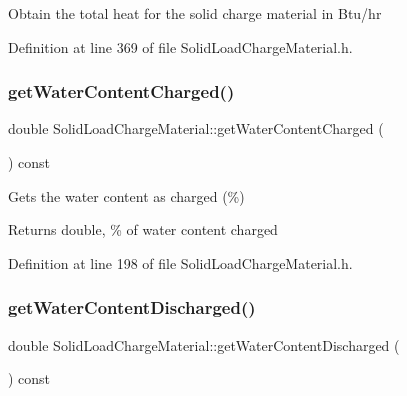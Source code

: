 Obtain the total heat for the solid charge material in Btu/hr 

Definition at line 369 of file Solid\+Load\+Charge\+Material.\+h.

\mbox{\label{class_solid_load_charge_material_a2f99a8553d12b45bad53acc14338199a}} 
\subsubsection{\texorpdfstring{get\+Water\+Content\+Charged()}{getWaterContentCharged()}}
{\footnotesize\ttfamily double Solid\+Load\+Charge\+Material\+::get\+Water\+Content\+Charged (\begin{DoxyParamCaption}{ }\end{DoxyParamCaption}) const\hspace{0.3cm}{\ttfamily [inline]}}

Gets the water content as charged (\%) \begin{DoxyReturn}{Returns}
double, \% of water content charged 
\end{DoxyReturn}


Definition at line 198 of file Solid\+Load\+Charge\+Material.\+h.

\mbox{\label{class_solid_load_charge_material_aeeb6b341a6b5770155b85264dabbd1a7}} 
\subsubsection{\texorpdfstring{get\+Water\+Content\+Discharged()}{getWaterContentDischarged()}}
{\footnotesize\ttfamily double Solid\+Load\+Charge\+Material\+::get\+Water\+Content\+Discharged (\begin{DoxyParamCaption}{ }\end{DoxyParamCaption}) const\hspace{0.3cm}{\ttfamily [inline]}}

